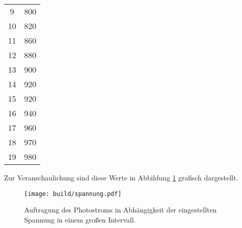 \begin{table}[htp]
\begin{center}
\begin{tabular}{SS}
                          9 & 800\\
                         10 & 820\\
                         11 & 860\\
                         12 & 880\\
                         13 & 900\\
                         14 & 920\\
                         15 & 920\\
                         16 & 940\\
                         17 & 960\\
                         18 & 970\\
                         19 & 980\\
                \bottomrule
                \end{tabular}
        \end{center}
\end{table}

Zur Veranschaulichung sind diese Werte in Abbildung \ref{fig:letztes} grafisch dargestellt.

\begin{figure}
  \centering
  \texttt{[image: build/spannung.pdf]}
  \caption{Auftragung des Photostroms in Abhängigkeit der eingestellten Spannung in einem großen Intervall.}
  \label{fig:letztes}
\end{figure}
